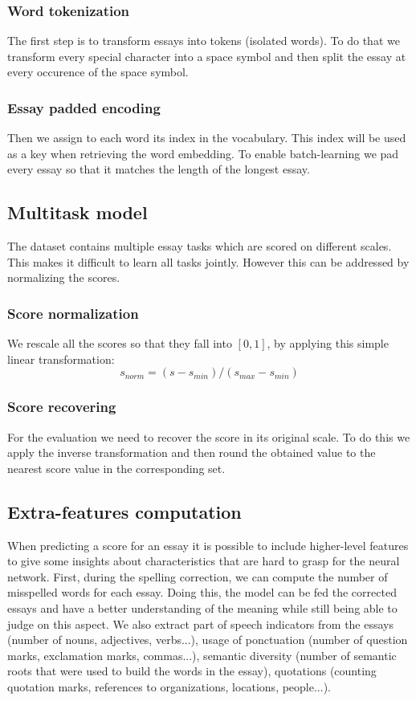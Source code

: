 \documentclass[a4paper,12pt,english]{article}
\begin{document}
\subsubsection{Word tokenization}
The first step is to transform essays into tokens (isolated words).
To do that we transform every special character into a space symbol and then split the essay at every occurence of the space symbol.
\subsubsection{Essay padded encoding}
Then we assign to each word its index in the vocabulary. This index will be used as a key when retrieving the word embedding.
To enable batch-learning we pad every essay so that it matches the length of the longest essay.

\subsection{Multitask model}
The dataset contains multiple essay tasks which are scored on different scales.
This makes it difficult to learn all tasks jointly.
However this can be addressed by normalizing the scores.
\subsubsection{Score normalization}
We rescale all the scores so that they fall into $[0,1]$, by applying this simple linear transformation:
\begin{equation}
s_{norm} = (s - s_{min}) / (s_{max} - s_{min})
\end{equation}
\subsubsection{Score recovering}
For the evaluation we need to recover the score in its original scale.
To do this we apply the inverse transformation and then round the obtained value to the nearest score value in the corresponding set.

\subsection{Extra-features computation}
When predicting a score for an essay it is possible to include higher-level features to give some insights about characteristics that are hard to grasp for the neural network.
First, during the spelling correction, we can compute the number of misspelled words for each essay. Doing this, the model can be fed the corrected essays and have a better understanding of the meaning while still being able to judge on this aspect.
We also extract part of speech indicators from the essays (number of nouns, adjectives, verbs...), usage of ponctuation (number of question marks, exclamation marks, commas...), semantic diversity (number of semantic roots that were used to build the words in the essay), quotations (counting quotation marks, references to organizations, locations, people...).
\end{document}
